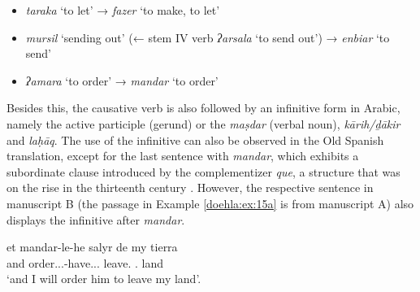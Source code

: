 \documentclass[output=paper]{langscibook}
\begin{document}
\begin{itemize}
\item[]\textit{taraka} ‘to let’ → \textit{fazer} ‘to make, to let’
\item[]\textit{mursil} ‘sending out’ (← stem IV verb \textit{ʔarsala} ‘to send out’) → \textit{enbiar} ‘to send’
\item[]\textit{ʔamara} ‘to order’ → \textit{mandar} ‘to order’
\end{itemize}

Besides this, the causative verb is also followed by an infinitive form in Arabic, namely the active participle (gerund) or the \textit{maṣdar} (verbal noun), \textit{kārih/ḏākir} and \textit{laḥāq}. The use of the infinitive can also be observed in the Old Spanish translation, except for the last sentence with \textit{mandar}, which exhibits a subordinate clause introduced by the complementizer \textit{que}, a structure that was on the rise in the thirteenth century \citep{sanaphre_villanueva_analytic_2010}. However, the respective sentence in manuscript B (the passage in Example \ref{doehla:ex:15a} is from manuscript A) also displays the infinitive after \textit{mandar}.


\begin{exe}  %
    \begin{xlist}
 \label{doehla:ex:15c}
        \gll et mandar-le-he salyr de my tierra \\
        and order.\OBJ.\Third\SG.\M-have.\AUX.\First\SG.\PRS{} leave.\Inf{} \ABL{} \POSS.\First\SG{} land \\
        \glt ‘and I will order him to leave my land’. \citep[BI.157a]{dohla_libro_2009}
    \end{xlist}
\end{exe}
\end{document}
